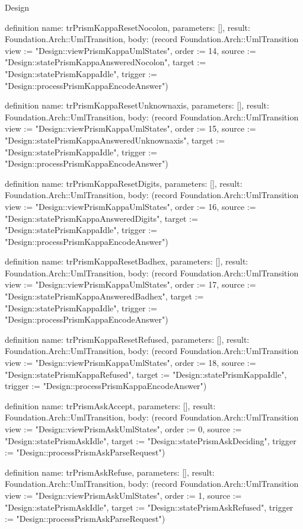 \begin{lexlean}{Design}
\begin{semanticmodule}
definition{
  name: trPrismKappaResetNocolon,
  parameters: [],
  result: Foundation.Arch::UmlTransition,
  body: (record Foundation.Arch::UmlTransition {view := "Design::viewPrismKappaUmlStates", order := 14, source := "Design::statePrismKappaAnsweredNocolon", target := "Design::statePrismKappaIdle", trigger := "Design::processPrismKappaEncodeAnswer"})
}

definition{
  name: trPrismKappaResetUnknownaxis,
  parameters: [],
  result: Foundation.Arch::UmlTransition,
  body: (record Foundation.Arch::UmlTransition {view := "Design::viewPrismKappaUmlStates", order := 15, source := "Design::statePrismKappaAnsweredUnknownaxis", target := "Design::statePrismKappaIdle", trigger := "Design::processPrismKappaEncodeAnswer"})
}

definition{
  name: trPrismKappaResetDigits,
  parameters: [],
  result: Foundation.Arch::UmlTransition,
  body: (record Foundation.Arch::UmlTransition {view := "Design::viewPrismKappaUmlStates", order := 16, source := "Design::statePrismKappaAnsweredDigits", target := "Design::statePrismKappaIdle", trigger := "Design::processPrismKappaEncodeAnswer"})
}

definition{
  name: trPrismKappaResetBadhex,
  parameters: [],
  result: Foundation.Arch::UmlTransition,
  body: (record Foundation.Arch::UmlTransition {view := "Design::viewPrismKappaUmlStates", order := 17, source := "Design::statePrismKappaAnsweredBadhex", target := "Design::statePrismKappaIdle", trigger := "Design::processPrismKappaEncodeAnswer"})
}

definition{
  name: trPrismKappaResetRefused,
  parameters: [],
  result: Foundation.Arch::UmlTransition,
  body: (record Foundation.Arch::UmlTransition {view := "Design::viewPrismKappaUmlStates", order := 18, source := "Design::statePrismKappaRefused", target := "Design::statePrismKappaIdle", trigger := "Design::processPrismKappaEncodeAnswer"})
}

definition{
  name: trPrismAskAccept,
  parameters: [],
  result: Foundation.Arch::UmlTransition,
  body: (record Foundation.Arch::UmlTransition {view := "Design::viewPrismAskUmlStates", order := 0, source := "Design::statePrismAskIdle", target := "Design::statePrismAskDeciding", trigger := "Design::processPrismAskParseRequest"})
}

definition{
  name: trPrismAskRefuse,
  parameters: [],
  result: Foundation.Arch::UmlTransition,
  body: (record Foundation.Arch::UmlTransition {view := "Design::viewPrismAskUmlStates", order := 1, source := "Design::statePrismAskIdle", target := "Design::statePrismAskRefused", trigger := "Design::processPrismAskParseRequest"})
}


\end{semanticmodule}
\end{lexlean}
